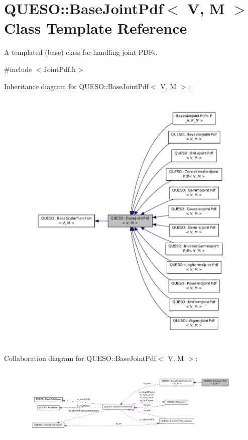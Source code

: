 \hypertarget{class_q_u_e_s_o_1_1_base_joint_pdf}{\section{Q\-U\-E\-S\-O\-:\-:Base\-Joint\-Pdf$<$ V, M $>$ Class Template Reference}
\label{class_q_u_e_s_o_1_1_base_joint_pdf}
}


A templated (base) class for handling joint P\-D\-Fs.  




{\ttfamily \#include $<$Joint\-Pdf.\-h$>$}



Inheritance diagram for Q\-U\-E\-S\-O\-:\-:Base\-Joint\-Pdf$<$ V, M $>$\-:
\nopagebreak
\begin{figure}[H]
\begin{center}
\leavevmode
\includegraphics[width=350pt]{class_q_u_e_s_o_1_1_base_joint_pdf__inherit__graph}
\end{center}
\end{figure}


Collaboration diagram for Q\-U\-E\-S\-O\-:\-:Base\-Joint\-Pdf$<$ V, M $>$\-:
\nopagebreak
\begin{figure}[H]
\begin{center}
\leavevmode
\includegraphics[width=350pt]{class_q_u_e_s_o_1_1_base_joint_pdf__coll__graph}
\end{center}
\end{figure}
